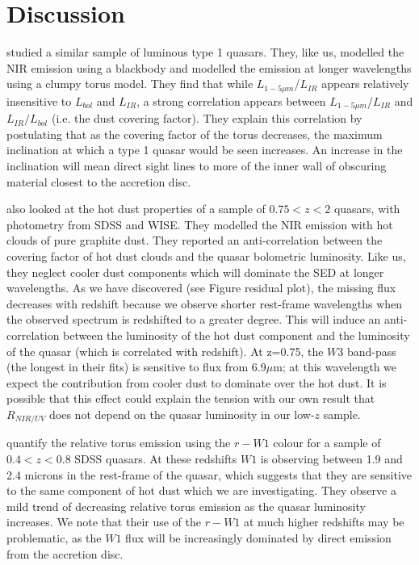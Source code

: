\section{Discussion}

\citet{roseboom13} studied a similar sample of luminous type 1 quasars. 
They, like us, modelled the NIR emission using a blackbody and modelled the emission at longer wavelengths using a clumpy torus model. 
They find that while $L_{1-5\mu m}$/$L_{IR}$ appears relatively insensitive to $L_{bol}$ and $L_{IR}$, a strong correlation appears between $L_{1-5\mu m}$/$L_{IR}$ and $L_{IR}/L_{bol}$ (i.e. the dust covering factor). 
They explain this correlation by postulating that as the covering factor of the torus decreases, the maximum inclination at which a type 1 quasar would be seen increases. 
An increase in the inclination will mean direct sight lines to more of the inner wall of obscuring material closest to the accretion disc.

\citet{mor11} also looked at the hot dust properties of a sample of $0.75 < z < 2$ quasars, with photometry from SDSS and WISE. 
They modelled the NIR emission with hot clouds of pure graphite dust. 
They reported an anti-correlation between the covering factor of hot dust clouds and the quasar bolometric luminosity. 
Like us, they neglect cooler dust components which will dominate the SED at longer wavelengths. 
As we have discovered (see Figure residual plot), the missing flux decreases with redshift because we observe shorter rest-frame wavelengths when the observed spectrum is redshifted to a greater degree. 
This will induce an anti-correlation between the luminosity of the hot dust component and the luminosity of the quasar (which is correlated with redshift). 
At z=0.75, the $W3$ band-pass (the longest in their fits) is sensitive to flux from 6.9$\mu$m; at this wavelength we expect the contribution from cooler dust to dominate over the hot dust. 
It is possible that this effect could explain the tension with our own result that $R_{NIR/UV}$ does not depend on the quasar luminosity in our low-$z$ sample. 

\citet{shen14} quantify the relative torus emission using the $r-W1$ colour for a sample of $0.4 < z < 0.8$ SDSS quasars. 
At these redshifts $W1$ is observing between 1.9 and 2.4 microns in the rest-frame of the quasar, which suggests that they are sensitive to the same component of hot dust which we are investigating. 
They observe a mild trend of decreasing relative torus emission as the quasar luminosity increases. 
We note that their use of the $r-W1$ at much higher redshifts may be problematic, as the $W1$ flux will be increasingly dominated by direct emission from the accretion disc. 

